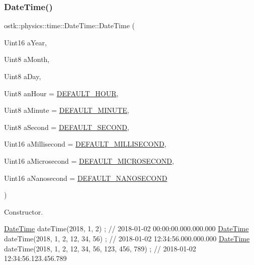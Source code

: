 \subsubsection{\texorpdfstring{Date\+Time()}{DateTime()}\hspace{0.1cm}{\footnotesize\ttfamily [2/2]}}
{\footnotesize\ttfamily ostk\+::physics\+::time\+::\+Date\+Time\+::\+Date\+Time (\begin{DoxyParamCaption}\item[{Uint16}]{a\+Year,  }\item[{Uint8}]{a\+Month,  }\item[{Uint8}]{a\+Day,  }\item[{Uint8}]{an\+Hour = {\ttfamily \hyperlink{_date_time_8hpp_a29cf77aa34816fadd42d28e0076972d2}{D\+E\+F\+A\+U\+L\+T\+\_\+\+H\+O\+UR}},  }\item[{Uint8}]{a\+Minute = {\ttfamily \hyperlink{_date_time_8hpp_a54870f99937ade8acd8a74e2162f6291}{D\+E\+F\+A\+U\+L\+T\+\_\+\+M\+I\+N\+U\+TE}},  }\item[{Uint8}]{a\+Second = {\ttfamily \hyperlink{_date_time_8hpp_a6ac0fc9f50c93ddbea90f7ee16876c0a}{D\+E\+F\+A\+U\+L\+T\+\_\+\+S\+E\+C\+O\+ND}},  }\item[{Uint16}]{a\+Millisecond = {\ttfamily \hyperlink{_date_time_8hpp_ac04ce019c94f46b059ce2c38a461b09c}{D\+E\+F\+A\+U\+L\+T\+\_\+\+M\+I\+L\+L\+I\+S\+E\+C\+O\+ND}},  }\item[{Uint16}]{a\+Microsecond = {\ttfamily \hyperlink{_date_time_8hpp_ab098709ee4b926644c1c68216add901b}{D\+E\+F\+A\+U\+L\+T\+\_\+\+M\+I\+C\+R\+O\+S\+E\+C\+O\+ND}},  }\item[{Uint16}]{a\+Nanosecond = {\ttfamily \hyperlink{_date_time_8hpp_a68609a8be8c5d286f17625e24a2e149a}{D\+E\+F\+A\+U\+L\+T\+\_\+\+N\+A\+N\+O\+S\+E\+C\+O\+ND}} }\end{DoxyParamCaption})}



Constructor. 


\begin{DoxyCode}
\hyperlink{classostk_1_1physics_1_1time_1_1_date_time_a974b5a7581ae7461ccf0e6ab85e42633}{DateTime} dateTime(2018, 1, 2) ; \textcolor{comment}{// 2018-01-02 00:00:00.000.000.000}
\hyperlink{classostk_1_1physics_1_1time_1_1_date_time_a974b5a7581ae7461ccf0e6ab85e42633}{DateTime} dateTime(2018, 1, 2, 12, 34, 56) ; \textcolor{comment}{// 2018-01-02 12:34:56.000.000.000}
\hyperlink{classostk_1_1physics_1_1time_1_1_date_time_a974b5a7581ae7461ccf0e6ab85e42633}{DateTime} dateTime(2018, 1, 2, 12, 34, 56, 123, 456, 789) ; \textcolor{comment}{// 2018-01-02 12:34:56.123.456.789}
\end{DoxyCode}



